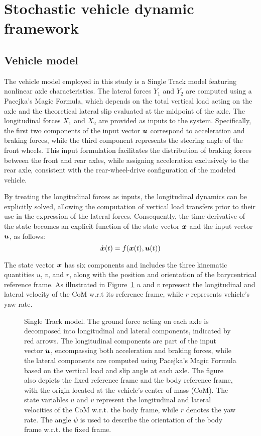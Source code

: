 \section{Stochastic vehicle dynamic framework}
\label{sec:svdf}

\subsection{Vehicle model}
\label{sec:vehicle_model}
The vehicle model employed in this study is a Single Track model featuring nonlinear axle characteristics. The lateral forces $Y_1$ and $Y_2$ are computed using a Pacejka's Magic Formula, which depends on the total vertical load acting on the axle and the theoretical lateral slip evaluated at the midpoint of the axle.
The longitudinal forces $X_1$ and $X_2$ are provided as inputs to the system. Specifically, the first two components of the input vector $\boldsymbol{u}$ correspond to acceleration and braking forces, while the third component represents the steering angle of the front wheels. This input formulation facilitates the distribution of braking forces between the front and rear axles, while assigning acceleration exclusively to the rear axle, consistent with the rear-wheel-drive configuration of the modeled vehicle.

By treating the longitudinal forces as inputs, the longitudinal dynamics can be explicitly solved, allowing the computation of vertical load transfers prior to their use in the expression of the lateral forces. Consequently, the time derivative of the state becomes an explicit function of the state vector $\boldsymbol{x}$ and the input vector $\boldsymbol{u}$, as follows:
\begin{equation}
	\dot{\boldsymbol{x}}(t) = f(\boldsymbol{x}(t), \boldsymbol{u}(t))
\end{equation}

The state vector $\boldsymbol{x}$ has six components and includes the three kinematic quantities $u$, $v$, and $r$, along with the position and orientation of the barycentrical reference frame. As illustrated in Figure~\ref{fig:vehicle_model} $u$ and $v$ represent the longitudinal and lateral velocity of the CoM w.r.t its reference frame, while $r$ represents vehicle's yaw rate.

\begin{figure}
	\centering
	
	\caption{Single Track model. The ground force acting on each axle is decomposed into longitudinal and lateral components, indicated by red arrows. The longitudinal components are part of the input vector $\boldsymbol{u}$, encompassing both acceleration and braking forces, while the lateral components are computed using Pacejka's Magic Formula based on the vertical load and slip angle at each axle. The figure also depicts the fixed reference frame and the body reference frame, with the origin located at the vehicle's center of mass (CoM). The state variables $u$ and $v$ represent the longitudinal and lateral velocities of the CoM w.r.t. the body frame, while $r$ denotes the yaw rate. The angle $\psi$ is used to describe the orientation of the body frame w.r.t. the fixed frame.}
	\label{fig:vehicle_model}
\end{figure}

